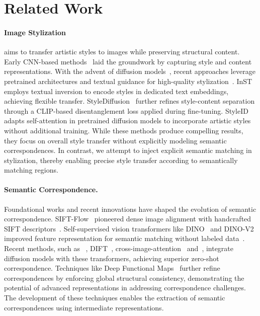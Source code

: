 \section{Related Work}
\paragraph{\bf{Image Stylization}} aims to transfer artistic styles to images while preserving structural content.
Early CNN-based methods~\cite{nst2016gatys, huang2017adain, dumoulin2017adversarially} laid the groundwork by capturing style and content representations.
With the advent of diffusion models~\cite{ho2020ddpm, rombach2022latentdiffusion}, recent approaches leverage pretrained architectures and textual guidance for high-quality stylization~\cite{chung2024styleid, subrtova2023diffusionimageanalogies, li2023stylediffusion, everaert2023diffusioninstyle, yang2023zero, li2024diffstyler, zhang2023inst}.
InST~\cite{zhang2023inst} employs textual inversion to encode styles in dedicated text embeddings, achieving flexible transfer.
StyleDiffusion~\cite{li2023stylediffusion} further refines style-content separation through a CLIP-based disentanglement loss applied during fine-tuning.
StyleID~\cite{chung2024styleid} adapts self-attention in pretrained diffusion models to incorporate artistic styles without additional training.
While these methods produce compelling results, they focus on overall style transfer without explicitly modeling semantic correspondences.
In contrast, we attempt to inject explicit semantic matching in stylization, thereby enabling precise style transfer according to semantically matching regions.



\paragraph{\bf{Semantic Correspondence.}}
Foundational works and recent innovations have shaped the evolution of semantic correspondence.
SIFT-Flow~\cite{liu2011siftflow} pioneered dense image alignment with handcrafted SIFT descriptors~\cite{lowe2004sift}.
Self-supervised vision transformers like DINO~\cite{caron2021dino} and DINO-V2~\cite{oquab2023dinov2, darcet2023vitneedreg} improved feature representation for semantic matching without labeled data~\cite{tumanyan2023disentangling,tumanyan2022splicing}.
Recent methods, such as ~\cite{zhang2023tale,hedlin2023unsupervised}, DIFT~\cite{tang2023dift}, cross-image-attention~\cite{alaluf2024cross} and~\cite{go2024eyeforaneye}, integrate diffusion models with these transformers, achieving superior zero-shot correspondence.
Techniques like Deep Functional Maps~\cite{cheng2024zeroshot} further refine correspondences by enforcing global structural consistency, demonstrating the potential of advanced representations in addressing correspondence challenges.
The development of these techniques enables the extraction of semantic correspondences using intermediate representations. 


